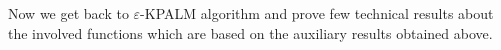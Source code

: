 \documentclass[11pt]{article}
\numberwithin{equation}{section}
\newtheorem{lemma}{Lemma}[proposition]
\begin{document}
%
%

Now we get back to $\varepsilon$-KPALM algorithm and prove few technical results about the involved functions which are based on the auxiliary results obtained above.
\end{document}
